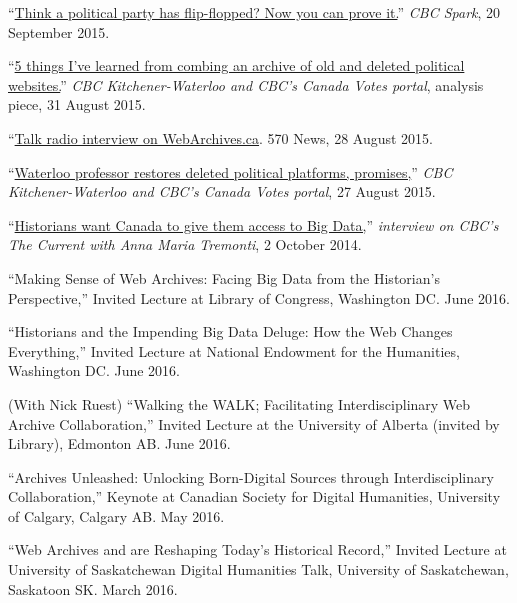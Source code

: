 \documentclass[11pt,article,oneside]{memoir}
\begin{document}
\ind ``\href{http://www.cbc.ca/radio/spark/293-enhancing-books-wondering-where-the-time-went-and-more-1.3229541/think-a-political-party-has-flip-flopped-now-you-can-prove-it-1.3229550}{Think a political party has flip-flopped? Now you can prove it.}'' \emph{CBC Spark}, 20 September 2015. 

\ind ``\href{http://www.cbc.ca/news/canada/kitchener-waterloo/5-things-i-ve-learned-from-combing-an-archive-of-old-and-deleted-political-websites-1.3209731}{5 things I've learned from combing an archive of old and deleted political websites.}'' \emph{CBC Kitchener-Waterloo and CBC's Canada Votes portal}, analysis piece, 31 August 2015.

\ind ``\href{http://www.570news.com/2015/08/28/friday-august-28th-2015-1pm/}{Talk radio interview on WebArchives.ca}. 570 News, 28 August 2015.

\ind ``\href{http://www.cbc.ca/news/canada/kitchener-waterloo/waterloo-professor-restores-deleted-political-platforms-promises-1.3204877}{Waterloo professor restores deleted political platforms, promises,}'' \emph{CBC Kitchener-Waterloo and CBC's Canada Votes portal}, 27 August 2015. 

\ind ``\href{http://www.cbc.ca/radio/thecurrent/oct-2-2014-1.2907466/historians-want-canada-to-give-them-access-to-big-data-1.2907471}{Historians want Canada to give them access to Big Data,}'' \emph{interview on CBC's The Current with Anna Maria Tremonti}, 2 October 2014. 

\medskip

\ind ``Making Sense of Web Archives: Facing Big Data from the Historian's Perspective,'' Invited Lecture at Library of Congress, Washington DC. June 2016.

\ind ``Historians and the Impending Big Data Deluge: How the Web Changes Everything,'' Invited Lecture at National Endowment for the Humanities, Washington DC. June 2016.

\ind (With Nick Ruest) ``Walking the WALK; Facilitating Interdisciplinary Web Archive Collaboration,'' Invited Lecture at the University of Alberta (invited by Library), Edmonton AB. June 2016.

\ind ``Archives Unleashed: Unlocking Born-Digital Sources through Interdisciplinary Collaboration,'' Keynote at Canadian Society for Digital Humanities, University of Calgary, Calgary AB. May 2016.

\ind ``Web Archives and are Reshaping Today's Historical Record,'' Invited Lecture at University of Saskatchewan Digital Humanities Talk, University of Saskatchewan, Saskatoon SK. March 2016.
\end{document}
